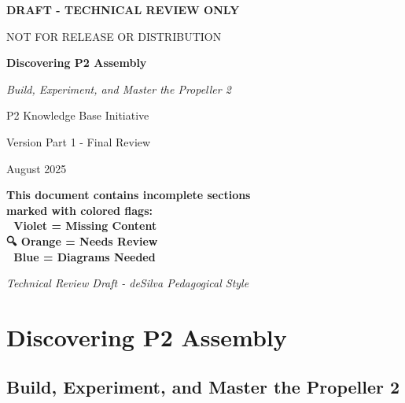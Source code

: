 \documentclass[11pt]{book}
\begin{document}
\begin{titlepage}
\centering

{\huge\bfseries\color{red}DRAFT - TECHNICAL REVIEW ONLY\par}
\vspace{0.5cm}
{\large\color{red}NOT FOR RELEASE OR DISTRIBUTION\par}
\vspace{1cm}

\vspace*{2cm}
{\Huge\bfseries Discovering P2 Assembly\par}
\vspace{0.5cm}
{\Large\itshape Build, Experiment, and Master the Propeller 2\par}
\vspace{2cm}
{\large P2 Knowledge Base Initiative\par}
\vspace{1cm}
{\large\color{red}Version Part 1 - Final Review\par}
\vspace{0.5cm}
{\large August 2025\par}
\vspace{1cm}

\begin{tcolorbox}[colback=yellow!20,colframe=red!50,boxrule=2pt]
\centering\bfseries
This document contains incomplete sections\\marked with colored flags:\\[0.5em]
🚧 Violet = Missing Content\\  
🔍 Orange = Needs Review\\
🎨 Blue = Diagrams Needed
\end{tcolorbox}

\vfill
{\small\itshape Technical Review Draft - deSilva Pedagogical Style\par}
\end{titlepage}

\tableofcontents
\clearpage

\hypertarget{discovering-p2-assembly}{%
\section{Discovering P2 Assembly}\label{discovering-p2-assembly}}

\hypertarget{build-experiment-and-master-the-propeller-2}{%
\subsection{Build, Experiment, and Master the Propeller
2}\label{build-experiment-and-master-the-propeller-2}}
\end{document}
